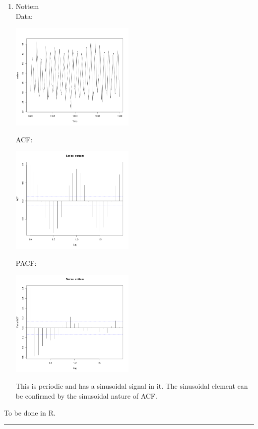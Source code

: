 \documentclass[11pt,paper=a4,answers]{exam}
\begin{document}
\begin{questions}
\begin{enumerate}[(a)]
\begin{enumerate}
        \item Nottem\\
        Data:\\
        \centerline{\includegraphics[width=6cm]{not.png}}
        \newpage
        ACF:\\
        \centerline{\includegraphics[width=6cm]{nacf.png}}
        PACF:\\
        \centerline{\includegraphics[width=6cm]{npacf.png}}
        This is periodic and has a sinusoidal signal in it. The sinusoidal element can be confirmed by the sinusoidal nature of ACF.
    \end{enumerate}
\end{enumerate}
\question
To be done in R.
\end{questions}
\begin{center}
\rule{.7\textwidth}{1pt}
\end{center}
\end{document}
